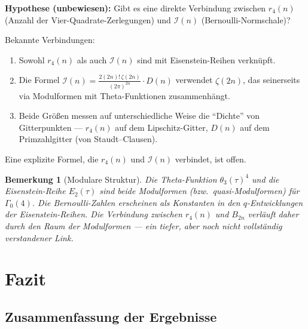 \documentclass[12pt,a4paper]{article}
\newtheorem{bemerkung}[definition]{Bemerkung}
\newcommand{\In}{\mathcal{I}}
\begin{document}
\begin{tcolorbox}[lücke, title={Offene Frage: D${}_4$-Theta und Bernoulli-Normschalen}]
\textbf{Hypothese (unbewiesen):} Gibt es eine direkte Verbindung zwischen
$r_4(n)$ (Anzahl der Vier-Quadrate-Zerlegungen) und $\In(n)$ (Bernoulli-Normschale)?

Bekannte Verbindungen:
\begin{enumerate}[leftmargin=*, noitemsep, label=(\alph*)]
  \item Sowohl $r_4(n)$ als auch $\In(n)$ sind mit Eisenstein-Reihen verknüpft.
  \item Die Formel $\In(n) = \frac{2(2n)!\,\zeta(2n)}{(2\pi)^{2n}}\cdot D(n)$
        verwendet $\zeta(2n)$, das seinerseits via Modulformen mit Theta-Funktionen
        zusammenhängt.
  \item Beide Größen messen auf unterschiedliche Weise die ``Dichte'' von
        Gitterpunkten --- $r_4(n)$ auf dem Lipschitz-Gitter, $D(n)$ auf dem
        Primzahlgitter (von Staudt--Clausen).
\end{enumerate}

Eine explizite Formel, die $r_4(n)$ und $\In(n)$ verbindet, ist offen.
\end{tcolorbox}

\begin{bemerkung}[Modulare Struktur]
Die Theta-Funktion $\theta_3(\tau)^4$ und die Eisenstein-Reihe $E_2(\tau)$ sind
beide Modulformen (bzw.\ quasi-Modulformen) für $\Gamma_0(4)$. Die Bernoulli-Zahlen
erscheinen als Konstanten in den $q$-Entwicklungen der Eisenstein-Reihen.
Die Verbindung zwischen $r_4(n)$ und $B_{2n}$ verläuft daher durch den
Raum der Modulformen --- ein tiefer, aber noch nicht vollständig verstandener Link.
\end{bemerkung}

\section{Fazit}
\label{sec:fazit}

\subsection{Zusammenfassung der Ergebnisse}
\end{document}
